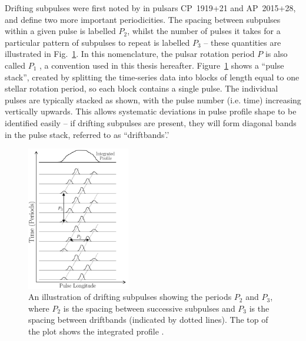 Drifting subpulses were first noted by \citet{DCxx1968} in pulsars CP~1919+21 and AP~2015+28, and define two more important periodicities. The spacing between subpulses within a given pulse is labelled $P_2$, whilst the number of pulses it takes for a particular pattern of subpulses to repeat is labelled $P_3$ \citep{SSPW1970} -- these quantities are illustrated in Fig.~\ref{fig: intro - drifting subpulses}. In this nomenclature, the pulsar rotation period $P$ is also called $P_1$ \citep{Bxxx1973}, a convention used in this thesis hereafter. Figure~\ref{fig: intro - drifting subpulses} shows a ``pulse stack'', created by splitting the time-series data into blocks of length equal to one stellar rotation period, so each block contains a single pulse. The individual pulses are typically stacked as shown, with the pulse number (i.e. time) increasing vertically upwards. This allows systematic deviations in pulse profile shape to be identified easily -- if drifting subpulses are present, they will form diagonal bands in the pulse stack, referred to as ``driftbands'.'  
\begin{figure}
	\centering
	\includegraphics[width=0.4\textwidth]{Figures/Introduction/drifting_subpulses}
    \caption[Drifting subpulses and the definitions of $P_2$ and $P_3$]{An illustration of drifting subpulses showing the periods $P_2$ and $P_3$, where $P_2$ is the spacing between successive subpulses and $P_3$ is the spacing between driftbands (indicated by dotted lines). The top of the plot shows the integrated profile \citep[after][]{Bxxx1973}.}
    \label{fig: intro - drifting subpulses} 
\end{figure}

